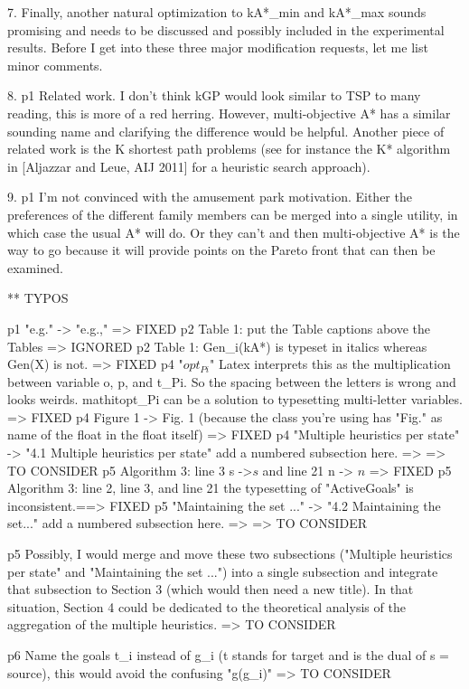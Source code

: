 7. Finally, another natural optimization to kA*_min and kA*_max sounds promising and needs to be
discussed and possibly included in the experimental results. Before I
get into these three major modification requests, let me list minor
comments.

8. p1 Related work. I don't think kGP would look similar to TSP to many
reading, this is more of a red herring. However, multi-objective A*
has a similar sounding name and clarifying the difference would be
helpful. Another piece of related work is the K shortest path problems
(see for instance the K* algorithm in [Aljazzar and Leue, AIJ 2011]
for a heuristic search approach).

9. p1 I'm not convinced with the amusement park motivation. Either the
preferences of the different family members can be merged into a
single utility, in which case the usual A* will do. Or they can't and
then multi-objective A* is the way to go because it will provide
points on the Pareto front that can then be examined.

** TYPOS


p1 "e.g." -> "e.g.," => FIXED
p2 Table 1: put the Table captions above the Tables => IGNORED
p2 Table 1: Gen_i(kA*) is typeset in italics whereas Gen(X) is not. => FIXED
p4 "$opt_{Pi}$" Latex interprets this as the multiplication 
between variable o, p, and t_{Pi}. So the spacing between the letters
is wrong and looks weirds. mathit{opt}_{Pi} can be a solution to
typesetting multi-letter variables. => FIXED
p4 Figure 1 -> Fig. 1 (because the class you're using has
"Fig." as name of the float in the float itself) => FIXED
p4 "Multiple heuristics per state" -> "4.1 Multiple 
heuristics per state" add a numbered subsection here. => => TO CONSIDER
p5 Algorithm 3: line 3 s ->$s$ and line 21 n -> $n$ => FIXED
p5 Algorithm 3: line 2, line 3, and line 21 the typesetting of
"ActiveGoals" is inconsistent.==> FIXED
p5 "Maintaining the set ..." -> "4.2 Maintaining the
set..." add a numbered subsection here. => => TO CONSIDER

p5 Possibly, I would merge and move these two subsections
("Multiple heuristics per state" and "Maintaining the
set ...") into a single subsection and integrate that subsection
to Section 3 (which would then need a new title). In that situation,
Section 4 could be dedicated to the theoretical analysis of the
aggregation of the multiple heuristics. => TO CONSIDER

p6 Name the goals t_i instead of g_i (t stands for target and is the
dual of s = source), this would avoid the confusing
"g(g_i)"  => TO CONSIDER

